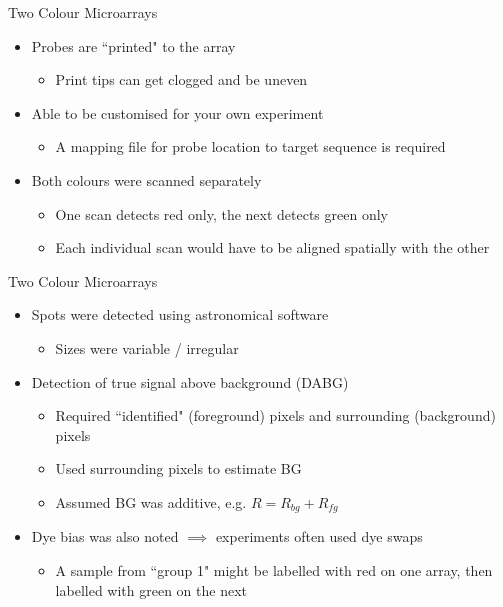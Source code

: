 \documentclass[aspectratio=169,11pt]{beamer}
\begin{document}
\begin{frame}{Two Colour Microarrays}

	\begin{itemize}
		\item Probes are ``printed" to the array
		\begin{itemize}
			\item Print tips can get clogged and be uneven
		\end{itemize}
		\item Able to be customised for your own experiment
		\begin{itemize}
			\item A mapping file for probe location to target sequence is required
		\end{itemize}
		\item Both colours were scanned separately
		\begin{itemize}
			\item One scan detects red only, the next detects green only
			\item Each individual scan would have to be aligned spatially with the other
		\end{itemize}
		
	\end{itemize}

\end{frame}

\begin{frame}{Two Colour Microarrays}

	\begin{itemize}
		\item Spots were detected using astronomical software
		\begin{itemize}
			\item Sizes were variable / irregular
		\end{itemize}
		\item Detection of true signal above background (DABG)
		\begin{itemize}		
			\item Required ``identified" (foreground) pixels and surrounding (background) pixels
			\item Used surrounding pixels to estimate BG
			\item Assumed BG was additive, e.g. $R = R_{bg} + R_{fg}$
		\end{itemize}
		\item Dye bias was also noted $\implies$ experiments often used dye swaps
		\begin{itemize}
			\item A sample from ``group 1" might be labelled with red on one array, then labelled with green on the next
		\end{itemize}
	\end{itemize}

\end{frame}
\end{document}

